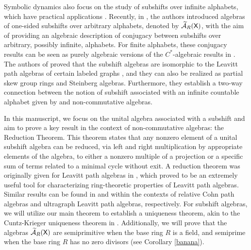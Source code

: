 \documentclass[a4paper,12pt]{amsart}
\theoremstyle{definition}
\theoremstyle{remark}
\numberwithin{equation}{section}
\newcommand{\osf}{{\normalfont \textsf{X}}}
\newcommand{\ualgshift}{\TCA_R(\osf)}
\newcommand{\CA}{\mathcal{A}}
\newcommand{\TCA}{\widetilde{\CA}}
\begin{document}
Symbolic dynamics also focus on the study of subshifts over infinite alphabets, which have practical applications \cite{KitchensBook, LindMarcus}. Recently, in \cite{BGGV}, the authors introduced algebras of one-sided subshifts over arbitrary alphabets, denoted by $\ualgshift$, with the aim of providing an algebraic description of conjugacy between subshifts over arbitrary, possibly infinite, alphabets. For finite alphabets, these conjugacy results can be seen as purely algebraic versions of the $C^*$-algebraic results in \cite{BrixCarlsen}. The authors of \cite{BGGV} proved that the subshift algebras are isomorphic to the Leavitt path algebras of certain labeled graphs \cite{BCGW21}, and they can also be realized as partial skew group rings and Steinberg algebras. Furthermore, they establish a two-way connection between the notion of subshift associated with an infinite countable alphabet given by \cite{OTW} and non-commutative algebras.

In this manuscript, we focus on the unital algebra associated with a subshift and aim to prove a key result in the context of non-commutative algebras: the Reduction Theorem. This theorem states that any nonzero element of a unital subshift algebra can be reduced, via left and right multiplication by appropriate elements of the algebra, to either a nonzero multiple of a projection or a specific sum of terms related to a minimal cycle without exit. A reduction theorem was originally given for Leavitt path algebras in \cite{socle}, which proved to be an extremely useful tool for characterizing ring-theoretic properties of Leavitt path algebras. Similar results can be found in \cite{relativecohn} and \cite{reduction} within the contexts of relative Cohn path algebras and ultragraph Leavitt path algebras, respectively. For subshift algebras, we will utilize our main theorem to establish a uniqueness theorem, akin to the Cuntz-Krieger uniqueness theorem in \cite{LPA_ring}. Additionally, we will prove that the algebras $\ualgshift$ are semiprimitive when the base ring $R$ is a field, and semiprime when the base ring $R$ has no zero divisors (see Corollary \ref{banana}).
\end{document}
